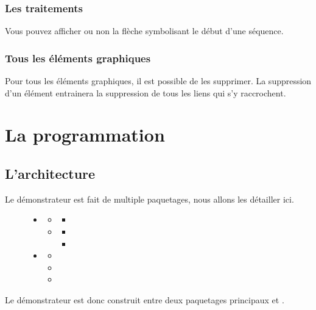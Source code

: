 \documentclass[12pt,a4paper,oneside]{book}
\begin{document}
		\subsubsection{Les traitements}
		Vous pouvez afficher ou non la flèche symbolisant le début d'une séquence.
		\subsubsection{Tous les éléments graphiques}
		Pour tous les éléments graphiques, il est possible de les supprimer. La suppression d'un élément entrainera la suppression de tous les liens qui s'y raccrochent.

	\section{La programmation}
	\subsection{L'architecture}
	Le démonstrateur est fait de multiple paquetages, nous allons les détailler ici.
	\begin{figure}
	\begin{itemize}
		\item {}
			\begin{itemize}
				\item {}
					\begin{itemize}
						\item {}	
					\end{itemize}
				\item {}
					\begin{itemize}
						\item {}
						\item {}
					\end{itemize}
			\end{itemize}
		\item {}
			\begin{itemize}
				\item {}
				\item {}
				\item {}
			\end{itemize}
		\end{itemize}
	\end{figure}
	Le démonstrateur est donc construit entre deux paquetages principaux  et . 
\end{document}
